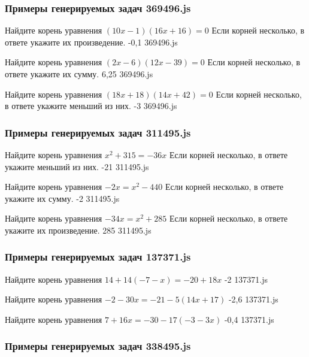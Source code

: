 
\subsubsection*{Примеры генерируемых задач 369496.js}   

\par{Найдите корень уравнения $(10x−1)(16x+16)=0$ Если корней несколько, в ответе укажите их произведение. }{ -0,1 }{369496.js}
\par{Найдите корень уравнения $(2x−6)(12x−39)=0$ Если корней несколько, в ответе укажите их сумму. }{ 6,25 }{369496.js}
\par{Найдите корень уравнения $(18x+18)(14x+42)=0$ Если корней несколько, в ответе укажите меньший из них. }{ -3 }{369496.js}


\subsubsection*{Примеры генерируемых задач 311495.js}   

\par{Найдите корень уравнения $x^2+315=−36x$ Если корней несколько, в ответе укажите меньший из них. }{ -21 }{311495.js}
\par{Найдите корень уравнения $−2x=x^2−440$ Если корней несколько, в ответе укажите их сумму. }{ -2 }{311495.js}
\par{Найдите корень уравнения $−34x=x^2+285$ Если корней несколько, в ответе укажите их произведение. }{ 285 }{311495.js}


\subsubsection*{Примеры генерируемых задач 137371.js}   

\par{Найдите корень уравнения $14+14(−7−x)=−20+18x$ }{ -2 }{137371.js}
\par{Найдите корень уравнения $−2−30x=−21−5(14x+17)$ }{ -2,6 }{137371.js}
\par{Найдите корень уравнения $7+16x=−30−17(−3−3x)$ }{ -0,4 }{137371.js}


\subsubsection*{Примеры генерируемых задач 338495.js}   

